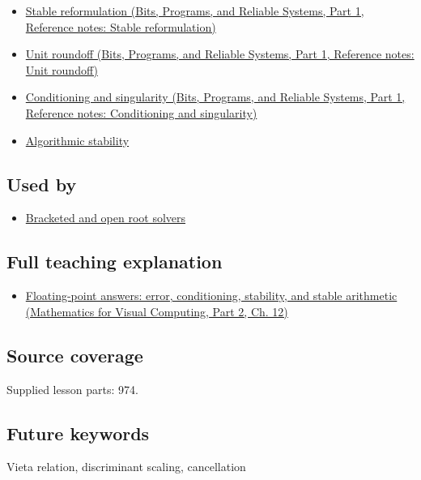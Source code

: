 \begin{itemize}
\tightlist
\item
  \href{../01-Bits-Programs-and-Reliable-Systems-P01/main.pdf\#appendix-d7f8ba961670}{Stable reformulation (Bits, Programs, and Reliable Systems, Part 1, Reference notes: Stable reformulation)}
\item
  \href{../01-Bits-Programs-and-Reliable-Systems-P01/main.pdf\#appendix-bc44f7b42f42}{Unit roundoff (Bits, Programs, and Reliable Systems, Part 1, Reference notes: Unit roundoff)}
\item
  \href{../01-Bits-Programs-and-Reliable-Systems-P01/main.pdf\#appendix-8f6a01f284a7}{Conditioning and singularity (Bits, Programs, and Reliable Systems, Part 1, Reference notes: Conditioning and singularity)}
\item
  \hyperref[appendix-aa2bf0d79639]{Algorithmic stability}
\end{itemize}

\subsection{Used by}\label{appendix-b9afba7f63e5-used-by}

\hypertarget{appendix-b9afba7f63e5-used-by}{}

\begin{itemize}
\tightlist
\item
  \hyperref[appendix-f63eb850796d]{Bracketed and open root solvers}
\end{itemize}

\subsection{Full teaching explanation}\label{appendix-b9afba7f63e5-full-teaching-explanation}

\hypertarget{appendix-b9afba7f63e5-full-teaching-explanation}{}

\begin{itemize}
\tightlist
\item
  \href{../02-Mathematics-for-Visual-Computing-P02/main.pdf\#02-foundations-ii-ch028-floating-point-answers-error-conditioning-stability-and-stable-arithmetic}{Floating-point answers: error, conditioning, stability, and stable arithmetic (Mathematics for Visual Computing, Part 2, Ch. 12)}
\end{itemize}

\subsection{Source coverage}\label{appendix-b9afba7f63e5-source-coverage}

\hypertarget{appendix-b9afba7f63e5-source-coverage}{}

Supplied lesson parts: 974.

\subsection{Future keywords}\label{appendix-b9afba7f63e5-future-keywords}

\hypertarget{appendix-b9afba7f63e5-future-keywords}{}

Vieta relation, discriminant scaling, cancellation
